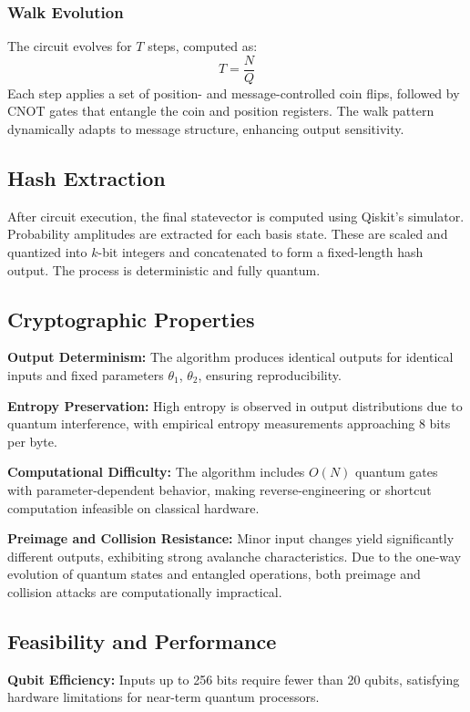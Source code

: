 \documentclass[conference]{IEEEtran}
\begin{document}
\subsubsection{Walk Evolution}
The circuit evolves for $T$ steps, computed as:
\[
T = \frac{N}{Q}
\]
 Each step applies a set of position- and message-controlled coin flips, followed by CNOT gates that entangle the coin and position registers. The walk pattern dynamically adapts to message structure, enhancing output sensitivity.

\subsection{Hash Extraction}

After circuit execution, the final statevector is computed using Qiskit's simulator. Probability amplitudes are extracted for each basis state. These are scaled and quantized into $k$-bit integers and concatenated to form a fixed-length hash output. The process is deterministic and fully quantum.

\subsection{Cryptographic Properties}

\textbf{Output Determinism:} The algorithm produces identical outputs for identical inputs and fixed parameters $\theta_1$, $\theta_2$, ensuring reproducibility.

\textbf{Entropy Preservation:} High entropy is observed in output distributions due to quantum interference, with empirical entropy measurements approaching 8 bits per byte.

\textbf{Computational Difficulty:} The algorithm includes $O(N)$ quantum gates with parameter-dependent behavior, making reverse-engineering or shortcut computation infeasible on classical hardware.

\textbf{Preimage and Collision Resistance:} Minor input changes yield significantly different outputs, exhibiting strong avalanche characteristics. Due to the one-way evolution of quantum states and entangled operations, both preimage and collision attacks are computationally impractical.

\subsection{Feasibility and Performance}

\textbf{Qubit Efficiency:} Inputs up to 256 bits require fewer than 20 qubits, satisfying hardware limitations for near-term quantum processors.
\end{document}
